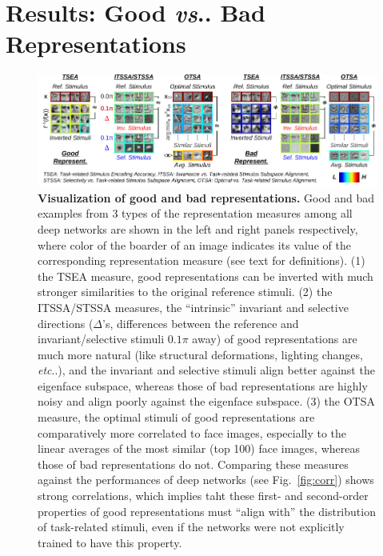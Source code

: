 \documentclass[fleqn]{article} %
\makeatletter
\DeclareRobustCommand\onedot{\futurelet\@let@token\@onedot}
\def\@onedot{\ifx\@let@token.\else.\null\fi\xspace}
\def\eg{\emph{e.g}\onedot} \def\Eg{\emph{E.g}\onedot}
\def\etc{\emph{etc}\onedot} \def\vs{\emph{vs}\onedot}
\makeatother
\begin{document}

\section{Results: Good \vs Bad Representations}
\label{sec:results2}

\begin{figure}[t]
\centering \includegraphics[width=\textwidth, trim=1.4ex 0.5ex 0 0, clip]{Figs/g_vs_b_repr.pdf} 
\caption{{\bf Visualization of good and bad representations.}
Good and bad examples from 3 types of the representation measures among all deep networks are shown in the left and right panels respectively, where color of the boarder of an image indicates its value of the corresponding representation measure (see text for definitions). %
(1) \Wrt the TSEA measure, good representations can be inverted with much stronger similarities to the original reference stimuli.
(2) \Wrt the ITSSA/STSSA measures, the ``intrinsic'' invariant and selective directions ($\Delta$'s, differences between the reference and invariant/selective stimuli $0.1\pi$ away) of good representations are much more natural (like structural deformations, lighting changes, \etc), and the invariant and selective stimuli align better against the eigenface subspace, whereas those of bad representations are highly noisy and align poorly against the eigenface subspace.
(3) \Wrt the OTSA measure, the optimal stimuli of good representations are comparatively more correlated to face images, especially to the linear averages of the most similar (top 100) face images, whereas those of bad representations do not.
Comparing these measures against the performances of deep networks (see Fig.~\ref{fig:corr}) shows strong correlations, which implies taht these first- and second-order properties of good representations must ``align with'' the distribution of task-related stimuli, even if the networks were not explicitly trained to have this property.
}
\label{fig:allrep2}
\end{figure}
\end{document}
